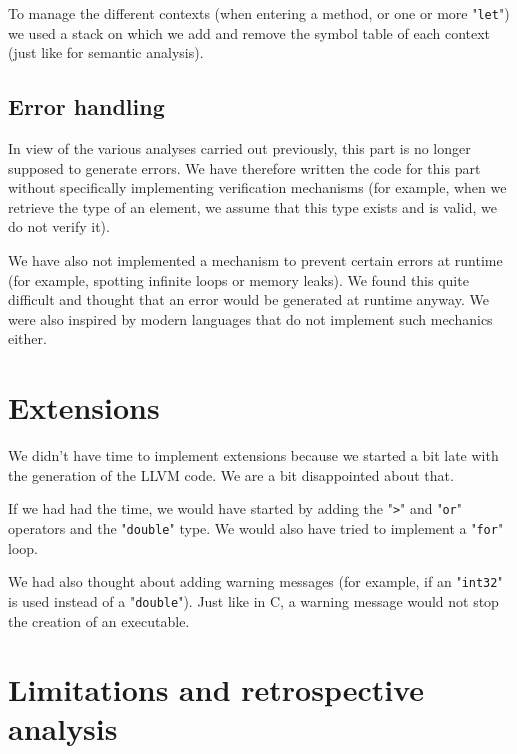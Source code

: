 \documentclass[a4paper, 12pt]{article}
\begin{document}
    To manage the different contexts (when entering a method, or one or more "\texttt{let}") we used a stack on which we add and remove the symbol table of each context (just like for semantic analysis).
    
    \subsection{Error handling}
    
    In view of the various analyses carried out previously, this part is no longer supposed to generate errors. We have therefore written the code for this part without specifically implementing verification mechanisms (for example, when we retrieve the type of an element, we assume that this type exists and is valid, we do not verify it).
    
    We have also not implemented a mechanism to prevent certain errors at runtime (for example, spotting infinite loops or memory leaks). We found this quite difficult and thought that an error would be generated at runtime anyway. We were also inspired by modern languages that do not implement such mechanics either.
    
    
    \section{Extensions}
    
    We didn't have time to implement extensions because we started a bit late with the generation of the LLVM code. We are a bit disappointed about that.
    
    If we had had the time, we would have started by adding the "\texttt{>}" and "\texttt{or}" operators and the "\texttt{double}" type. We would also have tried to implement a "\texttt{for}" loop.
    
    We had also thought about adding warning messages (for example, if an "\texttt{int32}" is used instead of a "\texttt{double}"). Just like in C, a warning message would not stop the creation of an executable.
    
    
    \section{Limitations and retrospective analysis}
    
\end{document}
